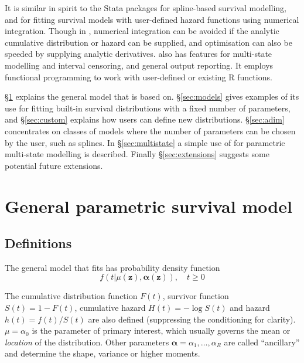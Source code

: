 \documentclass[nojss,nofooter]{jss}
\begin{document}
It is similar in spirit to the Stata packages 
\citep{stpm2} for spline-based survival modelling, and 
\citep{stgenreg} for fitting survival models with user-defined hazard
functions using numerical integration.  Though in ,
numerical integration can be avoided if the analytic cumulative
distribution or hazard can be supplied, and optimisation can also be
speeded by supplying analytic derivatives.   also has
features for multi-state modelling and interval censoring, and general
output reporting.  It employs functional programming to work with
user-defined or existing R functions.

\S\ref{sec:general} explains the general model that  is
based on.  \S\ref{sec:models} gives examples of its use for fitting
built-in survival distributions with a fixed number of parameters, and
\S\ref{sec:custom} explains how users can define new distributions.
\S\ref{sec:adim} concentrates on classes of models where the number of
parameters can be chosen by the user, such as splines.  In
\S\ref{sec:multistate} a simple use of  for parametric
multi-state modelling is described.  Finally \S\ref{sec:extensions}
suggests some potential future extensions.


\section{General parametric survival model}
\label{sec:general}

\subsection{Definitions} 

The general model that  fits has probability density function
\begin{equation}
  \label{eq:model}
  f(t | \mu(\mathbf{z}), \bm{\alpha}(\mathbf{z})), \quad t \geq 0  
\end{equation}

The cumulative distribution function $F(t)$, survivor
function $S(t) = 1 - F(t)$, cumulative hazard $H(t) = -\log S(t)$ and
hazard $h(t) = f(t)/S(t)$ are also defined (suppressing the conditioning for clarity).
$\mu=\alpha_0$ is the parameter of primary interest,
which usually governs the mean or \emph{location} of the distribution.  Other
parameters $\bm{\alpha} = \alpha_1, \ldots, \alpha_R$ are called
``ancillary'' and determine the shape, variance or higher moments.
\end{document}
